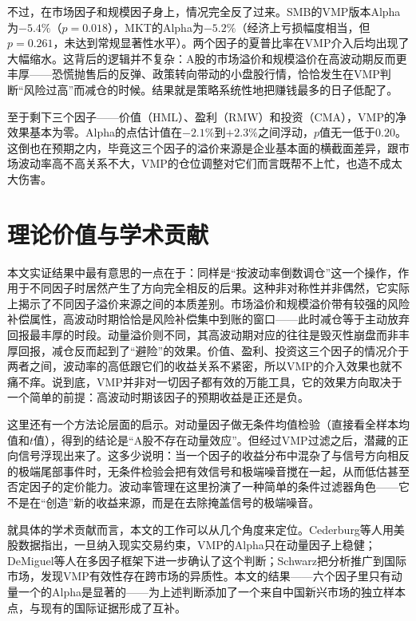 \documentclass[
    decl-page,
    oneside,
  ]{njuthesis}
\begin{document}
不过，在市场因子和规模因子身上，情况完全反了过来。SMB的VMP版本Alpha为$-5.4\%$（$p = 0.018$），MKT的Alpha为$-5.2\%$（经济上亏损幅度相当，但$p = 0.261$，未达到常规显著性水平）。两个因子的夏普比率在VMP介入后均出现了大幅缩水。这背后的逻辑并不复杂：A股的市场溢价和规模溢价在高波动期反而更丰厚——恐慌抛售后的反弹、政策转向带动的小盘股行情，恰恰发生在VMP判断“风险过高”而减仓的时候。结果就是策略系统性地把赚钱最多的日子低配了。

至于剩下三个因子——价值（HML）、盈利（RMW）和投资（CMA），VMP的净效果基本为零。Alpha的点估计值在$-2.1\%$到$+2.3\%$之间浮动，$p$值无一低于$0.20$。这倒也在预期之内，毕竟这三个因子的溢价来源是企业基本面的横截面差异，跟市场波动率高不高关系不大，VMP的仓位调整对它们而言既帮不上忙，也造不成太大伤害。

\section{理论价值与学术贡献}

本文实证结果中最有意思的一点在于：同样是“按波动率倒数调仓”这一个操作，作用于不同因子时居然产生了方向完全相反的后果。这种非对称性并非偶然，它实际上揭示了不同因子溢价来源之间的本质差别。市场溢价和规模溢价带有较强的风险补偿属性，高波动时期恰恰是风险补偿集中到账的窗口——此时减仓等于主动放弃回报最丰厚的时段。动量溢价则不同，其高波动期对应的往往是毁灭性崩盘而非丰厚回报，减仓反而起到了“避险”的效果。价值、盈利、投资这三个因子的情况介于两者之间，波动率的高低跟它们的收益关系不紧密，所以VMP的介入效果也就不痛不痒。说到底，VMP并非对一切因子都有效的万能工具，它的效果方向取决于一个简单的前提：高波动时期该因子的预期收益是正还是负。

这里还有一个方法论层面的启示。对动量因子做无条件均值检验（直接看全样本均值和$t$值），得到的结论是“A股不存在动量效应”。但经过VMP过滤之后，潜藏的正向信号浮现出来了。这多少说明：当一个因子的收益分布中混杂了与信号方向相反的极端尾部事件时，无条件检验会把有效信号和极端噪音搅在一起，从而低估甚至否定因子的定价能力。波动率管理在这里扮演了一种简单的条件过滤器角色——它不是在“创造”新的收益来源，而是在去除掩盖信号的极端噪音。

就具体的学术贡献而言，本文的工作可以从几个角度来定位。Cederburg等人\cite{cederburg2020performance}用美股数据指出，一旦纳入现实交易约束，VMP的Alpha只在动量因子上稳健；DeMiguel等人\cite{demiguel2024multifactor}在多因子框架下进一步确认了这个判断；Schwarz\cite{schwarz2025international}把分析推广到国际市场，发现VMP有效性存在跨市场的异质性。本文的结果——六个因子里只有动量一个的Alpha是显著的——为上述判断添加了一个来自中国新兴市场的独立样本点，与现有的国际证据形成了互补。
\end{document}
